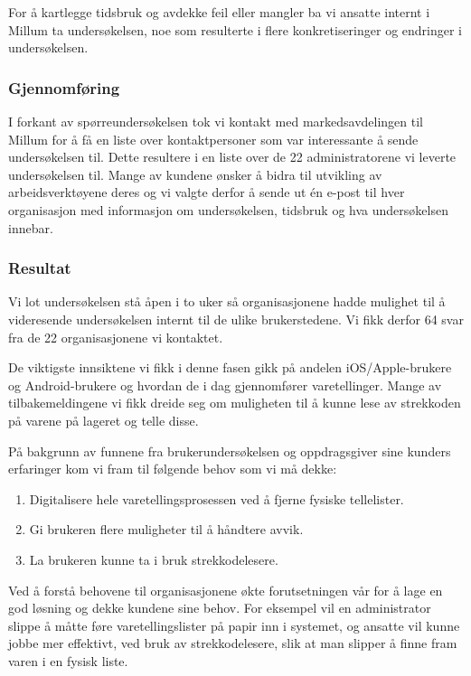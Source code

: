 For å kartlegge tidsbruk og avdekke feil eller mangler ba vi ansatte internt i Millum ta undersøkelsen, noe som resulterte i flere konkretiseringer og endringer i undersøkelsen.

\subsubsection{\textbf{Gjennomføring}}
I forkant av spørreundersøkelsen tok vi kontakt med markedsavdelingen til Millum for å få en liste over kontaktpersoner som var interessante å sende undersøkelsen til. Dette resultere i en liste over de 22 administratorene vi leverte undersøkelsen til. Mange av kundene ønsker å bidra til utvikling av arbeidsverktøyene deres og vi valgte derfor å sende ut én e-post til hver organisasjon med informasjon om undersøkelsen, tidsbruk og hva undersøkelsen innebar.

\subsubsection{\textbf{Resultat}}
Vi lot undersøkelsen stå åpen i to uker så organisasjonene hadde mulighet til å videresende undersøkelsen internt til de ulike brukerstedene. Vi fikk derfor 64 svar fra de 22 organisasjonene vi kontaktet.

De viktigste innsiktene vi fikk i denne fasen gikk på andelen iOS/Apple-brukere og Android-brukere og hvordan de i dag gjennomfører varetellinger. Mange av tilbakemeldingene vi fikk dreide seg om muligheten til å kunne lese av strekkoden på varene på lageret og telle disse. %

På bakgrunn av funnene fra brukerundersøkelsen og oppdragsgiver sine kunders erfaringer kom vi fram til følgende behov som vi må dekke:

\begin{enumerate}
    \item Digitalisere hele varetellingsprosessen ved å fjerne fysiske tellelister.
    \item Gi brukeren flere muligheter til å håndtere avvik.
    \item La brukeren kunne ta i bruk strekkodelesere.
\end{enumerate}

Ved å forstå behovene til organisasjonene økte forutsetningen vår for å lage en god løsning og dekke kundene sine behov. For eksempel vil en administrator slippe å måtte føre varetellingslister på papir inn i systemet, og ansatte vil kunne jobbe mer effektivt, ved bruk av strekkodelesere, slik at man slipper å finne fram varen i en fysisk liste. 


